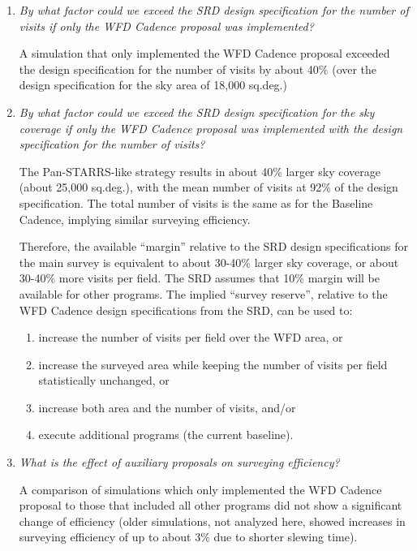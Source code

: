 \begin{enumerate}

\item {\it By what factor could we exceed the SRD design specification
for the number of visits if only the WFD Cadence proposal was
implemented?}

A simulation that only implemented the WFD Cadence proposal exceeded
the design specification for the number of visits by about 40\% (over
the design specification for the sky area of 18,000 sq.deg.)

\item {\it By what factor could we exceed the SRD design specification
for the sky coverage if only the WFD Cadence proposal was
implemented with the design specification for the number of visits?}

The Pan-STARRS-like strategy results in about 40\% larger sky
coverage (about 25,000 sq.deg.), with the mean number of visits at
92\% of the design specification. The total number of visits is the
same as for the Baseline Cadence, implying similar surveying efficiency.

Therefore, the available ``margin'' relative to the SRD design specifications
for the main survey is equivalent to about 30-40\% larger sky coverage, or
about 30-40\% more visits per field. The SRD assumes that 10\% margin
will be available for other programs. The implied ``survey reserve'',
relative to the WFD Cadence design specifications from the SRD, can
be used to:
  \begin{enumerate}
  \item increase the number of visits per field over the WFD area,  or
  \item increase the surveyed area while keeping the number of visits
  per field statistically unchanged, or
  \item increase both area and the number of visits, and/or
  \item execute additional programs (the current baseline).
  \end{enumerate}

\item {\it What is the effect of auxiliary proposals on surveying
efficiency?}

A comparison of simulations which only implemented the WFD Cadence
proposal to those that included all other programs did not show a
significant change of efficiency (older simulations, not analyzed
here, showed increases in surveying efficiency of up to about 3\% due
to shorter slewing time).



\end{enumerate}
